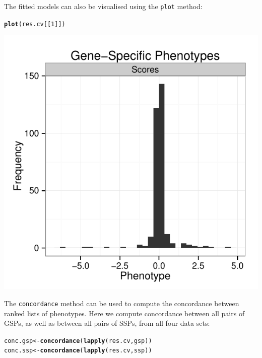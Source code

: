 \documentclass{article}\usepackage[]{graphicx}\usepackage[]{color}
\makeatletter
\newcommand{\hlnum}[1]{\textcolor[rgb]{0.686,0.059,0.569}{#1}}%
\newcommand{\hlstd}[1]{\textcolor[rgb]{0.345,0.345,0.345}{#1}}%
\newcommand{\hlkwb}[1]{\textcolor[rgb]{0.69,0.353,0.396}{#1}}%
\newcommand{\hlkwd}[1]{\textcolor[rgb]{0.737,0.353,0.396}{\textbf{#1}}}%
\newenvironment{kframe}{%
 \def\at@end@of@kframe{}%
 \ifinner\ifhmode%
  \def\at@end@of@kframe{\end{minipage}}%
  \begin{minipage}{\columnwidth}%
 \fi\fi%
 \def\FrameCommand##1{\hskip\@totalleftmargin \hskip-\fboxsep
 \colorbox{shadecolor}{##1}\hskip-\fboxsep
     \hskip-\linewidth \hskip-\@totalleftmargin \hskip\columnwidth}%
 \MakeFramed {\advance\hsize-\width
   \@totalleftmargin\z@ \linewidth\hsize
   \@setminipage}}%
 {\par\unskip\endMakeFramed%
 \at@end@of@kframe}
\newenvironment{knitrout}{}{} %
\makeatother
\begin{document}
The fitted models can also be visualised using the \texttt{plot} method:
\begin{knitrout}
\color{fgcolor}\begin{kframe}
\begin{alltt}
  \hlkwd{plot}\hlstd{(res.cv[[}\hlnum{1}\hlstd{]])}
\end{alltt}


{\ttfamily\noindent\itshape\color{messagecolor}{\#\# stat\_bin: binwidth defaulted to range/30. Use 'binwidth = x' to adjust this.}}\end{kframe}

{\centering \includegraphics[width=.75\textwidth]{tmp/gespeR-plot_cv-1} 

}



\end{knitrout}

% 
% 

The \texttt{concordance} method can be used to compute the concordance between ranked lists of phenotypes. Here we compute concordance between all pairs of GSPs, as well as between all pairs of SSPs, from all four data sets:
\begin{knitrout}
\color{fgcolor}\begin{kframe}
\begin{alltt}
  \hlstd{conc.gsp} \hlkwb{<-} \hlkwd{concordance}\hlstd{(}\hlkwd{lapply}\hlstd{(res.cv, gsp))}
  \hlstd{conc.ssp} \hlkwb{<-} \hlkwd{concordance}\hlstd{(}\hlkwd{lapply}\hlstd{(res.cv, ssp))}
\end{alltt}
\end{kframe}
\end{knitrout}
\end{document}
